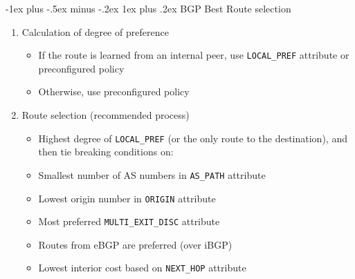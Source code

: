 \documentclass[10pt,landscape]{article}
\makeatletter
\newcommand{\subsubsubsection}{\@startsection{subsubsection}{3}{0mm}%
                                {-1ex plus -.5ex minus -.2ex}%
                                {1ex plus .2ex}%
                                {\normalfont\scriptsize\bfseries}}
\makeatother
\begin{document}
\begin{multicols*}{3}
\subsubsubsection{BGP Best Route selection}
\begin{enumerate}[topsep=0pt,noitemsep,wide=0pt, leftmargin=\dimexpr\labelwidth + 2\labelsep\relax]
  \item Calculation of degree of preference
  \begin{itemize}[topsep=0pt,noitemsep,wide=0pt, leftmargin=\dimexpr{} + 2\relax]
    \item If the route is learned from an internal peer, use \verb|LOCAL_PREF| attribute or preconfigured policy
    \item Otherwise, use preconfigured policy
  \end{itemize}
  \item Route selection (recommended process)
  \begin{itemize}[topsep=0pt,noitemsep,wide=0pt, leftmargin=\dimexpr{} + 2\relax]
    \item Highest degree of \verb|LOCAL_PREF| (or the only route to the destination), and then tie breaking conditions on:
    \item Smallest number of AS numbers in \verb|AS_PATH| attribute
    \item Lowest origin number in \verb|ORIGIN| attribute
    \item Most preferred \verb|MULTI_EXIT_DISC| attribute
    \item Routes from eBGP are preferred (over iBGP)
    \item Lowest interior cost based on \verb|NEXT_HOP| attribute
  \end{itemize}
\end{enumerate}


\end{multicols*}
\end{document}
